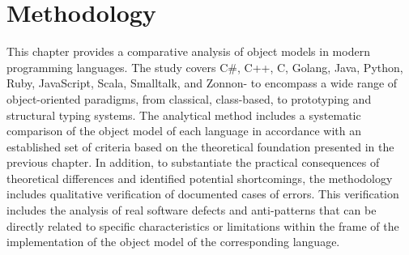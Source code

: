\chapter{Methodology}
\label{chap:met}

This chapter provides a comparative analysis of object models in modern programming languages. The study covers C\#, C++, C, Golang, Java, Python, Ruby, JavaScript, Scala, Smalltalk, and Zonnon- to encompass a wide range of object-oriented paradigms, from classical, class-based, to prototyping and structural typing systems. The analytical method includes a systematic comparison of the object model of each language in accordance with an established set of criteria based on the theoretical foundation presented in the previous chapter.  In addition, to substantiate the practical consequences of theoretical differences and identified potential shortcomings, the methodology includes qualitative verification of documented cases of errors. This verification includes the analysis of real software defects and anti-patterns that can be directly related to specific characteristics or limitations within the frame of the implementation of the object model of the corresponding language.
